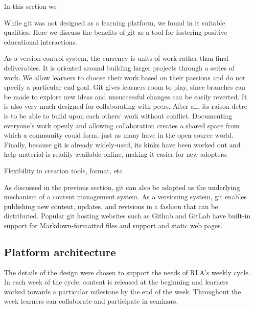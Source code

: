 \documentclass[12pt,twoside,vi]{mitthesis}
\newcommand{\wip}[1]{{\color{red} #1}}
\begin{document}
\wip{In this section we 

While git was not designed as a learning platform, we found in it suitable qualities. Here we discuss the benefits of git as a tool for fostering positive educational interactions.

As a version control system, the currency is units of work rather than final deliverables. It is oriented around building larger projects through a series of work. We allow learners to choose their work based on their passions and do not specify a particular end goal. Git gives learners room to play, since branches can be made to explore new ideas and unsuccessful changes can be easily reverted. It is also very much designed for collaborating with peers. After all, its raison detre is to be able to build upon each others’ work without conflict. Documenting everyone’s work openly and allowing collaboration creates a shared space from which a community could form, just as many have in the open source world. Finally, because git is already widely-used, its kinks have been worked out and help material is readily available online, making it easier for new adopters.

Flexibility in creation tools, format, etc

As discussed in the previous section, git can also be adapted as the underlying mechanism of a content management system. As a versioning system, git enables publishing new content, updates, and revisions in a fashion that can be distributed. Popular git hosting websites such as Github and GitLab have built-in support for Markdown-formatted files and support and static web pages.}

\subsection{Platform architecture}

The details of the design were chosen to support the needs of RLA’s weekly cycle. In each week of the cycle, content is released at the beginning and learners worked towards a particular milestone by the end of the week. Throughout the week learners can collaborate and participate in seminars.
\end{document}
